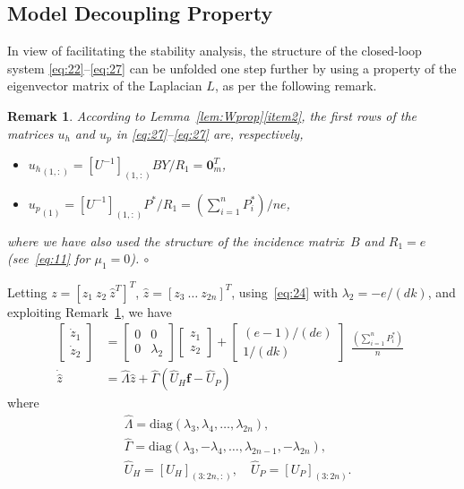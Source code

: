 \documentclass[letter, 10pt, conference]{ieeeconf}
\newtheorem{remark}[theorem]{Remark}
\newcommand{\diag}{\mathrm{diag}}
\newcommand{\mer}{\hfill$\circ$}
\newcommand{\1}{\mathbf{1}}
\newcommand{\0}{\mathbf{0}}
\begin{document}
{\subsection{Model Decoupling Property}
\label{subsec:decoup}
In view of facilitating the stability analysis, the structure of the
closed-loop system \eqref{eq:22}--\eqref{eq:27} can be unfolded one
step further by using a property of the eigenvector matrix of the
Laplacian $L$, as per the following remark.
\begin{remark}
  \label{rem:uhup}
  According to Lemma~\ref{lem:Wprop}\eqref{item2}, the first rows of the 
  matrices $u_h$ and $u_p$ in \eqref{eq:27}--\eqref{eq:27} are, respectively,
  \begin{itemize}
	\item	${u_h}_{(1,:)}=[U^{-1}]_{(1,:)} B Y /R_1 =\0_m^T$,
	\item	${u_p}_{(1)}=[U^{-1}]_{(1,:)} P^*/R_1 = (\sum_{i=1}^n P_i^*)/ne$,
  \end{itemize}
  where we have also used the structure of the incidence matrix~$B$
  and $R_1=e$ (see~\eqref{eq:11} for $\mu_1=0$).  \mer
\end{remark}


Letting $z=[z_1\ z_2\ \hat{z}^T]^T$, $\hat{z}=[z_3\ \dots \
z_{2n}]^T$, using~\eqref{eq:24} with $\lambda_2=-e/(dk)$, and
exploiting Remark~\ref{rem:uhup}, we have
\begin{align}
	\label{eq:28}
	\left[\begin{matrix} \dot{z}_1 \\ \dot{z}_2 \end{matrix}\right]
	&=\left[\begin{matrix} 
		0 & 0 \\ 0 & \lambda_2 
	 \end{matrix}\right]
	 \left[\begin{matrix} z_1 \\ z_2 \end{matrix}\right]
	+\left[\begin{matrix} (e-1)/(de) \\ 1/(dk) \end{matrix}\right]
	 \begin{matrix} \frac{(\sum_{i=1}^n P_i^*)}{n} \end{matrix}
	\\
	\label{eq:29}
	\dot{\hat{z}} &= \hat{\Lambda} \hat{z}+ \hat{\Gamma} (
        \hat{U}_H \mathbf{f} - \hat{U}_P )
\end{align}
where
\begin{align}
  \label{eq:Lhat}
  &\hat{\Lambda}=\diag(\lambda_3,\lambda_4, \dots,\lambda_{2n}), \\
  \label{eq:Ghat}
  &\hat{\Gamma}=\diag(\lambda_3,-\lambda_4,\dots,\lambda_{2n-1},-\lambda_{2n}), \\
  &\hat{U}_H=[U_H]_{(3:2n,:)}, \quad \hat{U}_P=[U_P]_{(3:2n)}. \label{eq:Uhat}
\end{align}



}
\end{document}
